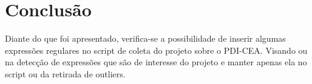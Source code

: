 \documentclass[a4paper]{article}
\begin{document}
\section{Conclusão}
Diante do que foi apresentado, verifica-se a possibilidade de inserir algumas expressões regulares no script de coleta do projeto sobre o PDI-CEA. Visando ou na detecção de expressões que são de interesse do projeto e manter apenas ela no script ou da retirada de outliers.

\bigskip
\end{document}
